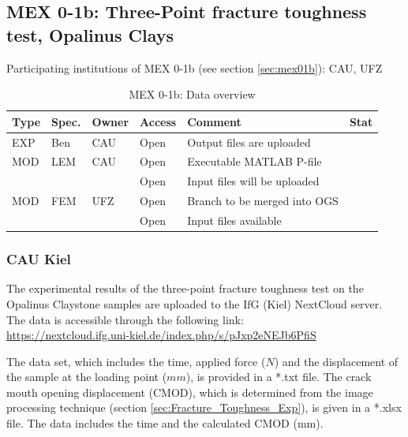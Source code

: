 \subsection{MEX 0-1b: Three-Point fracture toughness test, Opalinus Clays}

Participating institutions of MEX 0-1b (see section \ref{sec:mex01b}): CAU, UFZ

\begin{table}[ht!]
\caption{MEX 0-1b: Data overview}
\label{tab:dms-mex01b-overview}
\small
\begin{tabular}{l|l|l|l|L{4.7cm}|l}
\hline
{}
Type & Spec. & Owner & Access     & Comment                       & Stat \\ 
\hline
EXP  &   Ben    & CAU   & Open       & Output files are uploaded          &  \\
\hline \hline
MOD  & LEM   & CAU   & Open       & Executable MATLAB P-file               &  \\
     &       &       & Open       & Input files will be uploaded  &  \\
\hline
MOD  & FEM   & UFZ   & Open       & Branch to be merged into OGS  &  \\
     &       &       & Open       & Input files available         &  \\
%
\hline
\end{tabular}
\end{table}
\normalsize

\subsubsection*{CAU Kiel}

The experimental results of the three-point fracture toughness test on the Opalinus Claystone samples are uploaded to the IfG (Kiel) NextCloud server. The data is accessible through the following link:\\
\url{https://nextcloud.ifg.uni-kiel.de/index.php/s/pJxp2eNEJb6PfiS}

The data set, which includes the time, applied force ($N$) and the displacement of the sample at the loading point ($mm$), is provided in a *.txt file. The crack mouth opening displacement (CMOD), which is determined from the image processing technique (section \ref {sec:Fracture_Toughness_Exp}), is given in a *.xlsx file. The data includes the time and the calculated CMOD (mm). 


